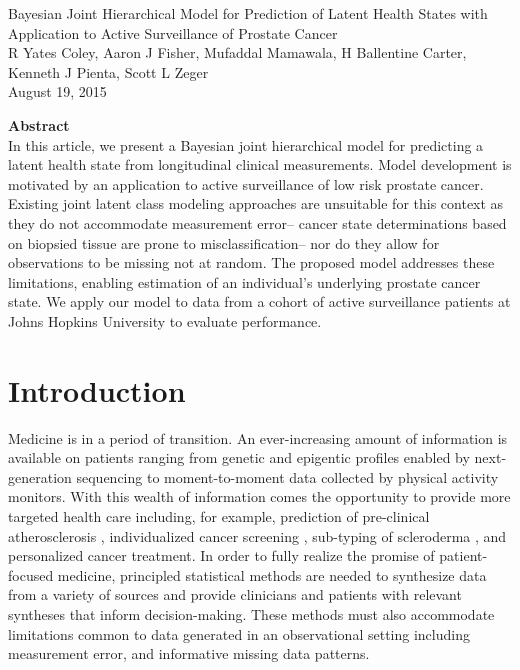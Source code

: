 \documentclass[12pt, letterpaper]{article}
\begin{document}
\begin{center}
\large Bayesian Joint Hierarchical Model for Prediction of Latent Health States with Application to Active Surveillance of Prostate Cancer\\
R Yates Coley, Aaron J Fisher,  Mufaddal Mamawala, H Ballentine Carter, Kenneth J Pienta, Scott L Zeger\\
August 19, 2015\\
\end{center}


\begin{center}
\textbf{Abstract}\\
In this article, we present a Bayesian joint hierarchical model for predicting a latent health state from longitudinal clinical measurements. Model development is motivated by an application to active surveillance of low risk prostate cancer. Existing joint latent class modeling approaches are unsuitable for this context as they do not accommodate measurement error-- cancer state determinations based on biopsied tissue are prone to misclassification-- nor do they allow for observations to be missing not at random. The proposed model addresses these limitations, enabling estimation of an individual's underlying prostate cancer state. We apply our model to data from a cohort of active surveillance patients at Johns Hopkins University to evaluate performance. %
\end{center}

\section{Introduction}

Medicine is in a period of transition. An ever-increasing amount of information is available on patients ranging from genetic and epigentic profiles enabled by next-generation sequencing to moment-to-moment data collected by physical activity monitors. With this wealth of information comes the opportunity to provide more targeted health care including, for example, prediction of pre-clinical atherosclerosis \cite{McGeachie2009}, individualized cancer screening \cite{Saini2014}, sub-typing of scleroderma \cite{Saria2015},  and personalized cancer treatment\cite{Hayden2009}. In order to fully realize the promise of patient-focused medicine, principled statistical methods are needed to synthesize data from a variety of sources and provide clinicians and patients with relevant syntheses that inform decision-making. These methods must also accommodate limitations common to data generated in an observational setting including measurement error, and informative missing data patterns.
\end{document}

